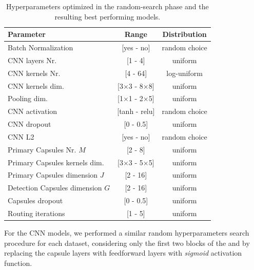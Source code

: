 \begin{table}[!t]
	\centering
	\begin{tabular} { lc c}
		\toprule
		Parameter & Range & Distribution\\  
		\midrule
		Batch Normalization  & [yes - no]	& random choice  \\
		\midrule
		
		CNN layers Nr.  & [1 - 4]& uniform \\
		
		CNN kernels Nr. & [4 - 64]& log-uniform \\
		
		CNN kernels dim. & [3$\times$3 - 8$\times$8]& uniform \\
		
		Pooling dim. & [1$\times$1 - 2$\times$5] & uniform 	\\
		
		CNN activation & [tanh - relu] & random choice \\
		
		CNN dropout  & [0 - 0.5]	& uniform  \\
		
		CNN L2  & [yes - no]	& random choice  \\		
		
		\midrule
		Primary Capsules Nr. $M$ & [2 - 8]	& uniform  \\
		
		Primary Capsules kernels dim. & [3$\times$3 - 5$\times$5]& uniform  \\
		
		Primary Capsules dimension $J$ & [2 - 16]	& uniform \\
		
		Detection Capsules dimension $G$ & [2 - 16]	& uniform \\
		
		Capsules dropout  & [0 - 0.5]	& uniform  \\
		
		Routing iterations  & [1 - 5]	& uniform \\
		
		\bottomrule
	\end{tabular}
	\caption[Polyphonic SED with CapsNets - Random Search]{Hyperparameters optimized in the random-search phase and the resulting best performing models.}		
	\label{tbl:hyper-params-capsule}
\end{table}

For the CNN models, we performed a similar random hyperparameters search procedure for each dataset, considering only the first two blocks of the  and by replacing the capsule layers with feedforward layers with \textit{sigmoid} activation function. 

